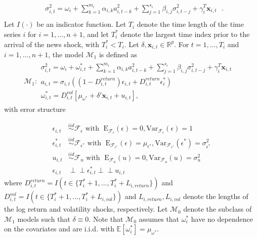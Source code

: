 \documentclass[11pt,3p,review,authoryear]{elsarticle}
\newcommand{\x}{\textbf{x}}
\def\mbf#1{\mathbf{#1}} %
\newcommand{\simiid}{\stackrel{iid}{\sim}} %
\newcommand{\indep}{\perp \!\!\! \perp } %
\def\mrm#1{\mathrm{#1}} %
\def\mc#1{\mathcal{#1}} %
\def\E{\mathbb{E}} %
\def\mc#1{\mathcal{#1}}
\theoremstyle{definition}
\begin{document}
\begin{align*}
&\sigma_{i,t}^{2} = \omega_{i} + \sum^{m_{i}}_{k=1}\alpha_{i,k}a^{2}_{i,t-k} + \sum_{j=1}^{s_{i}}\beta_{i,j}\sigma_{i,t-j}^{2} + \gamma_{i}^{T} \x_{i,t} \text{ }. \\
\end{align*}
Let $I(\cdot)$ be an indicator function.  Let $T_i$ denote the time length of the time series $i$ for $i = 1, \ldots, n+1$, and let $T_i^*$ denote the largest time index prior to the arrival of the news shock, with $T_i^* < T_i$.  Let $\delta, \x_{i,t} \in \mathbb{R}^{p}$.  For $t= 1, \ldots, T_i$ and $i = 1, \ldots, n+1$, the model $\mc{M}_1$ is defined as 
\begin{align*}
  \mc{M}_1 \colon \begin{array}{l}
     \sigma^{2}_{i,t} = \omega_{i} + \omega^{*}_{i,t} + \sum^{m_{i}}_{k=1}\alpha_{i,k}a^{2}_{i,t-k} + \sum_{j=1}^{s_{i}}\beta_{i,j}\sigma_{i,t-j}^{2} + \gamma_{i}^{T} \x_{i,t} \text{ }\\[.2cm]
     a_{i,t} = \sigma_{i,t}((1-D^{return}_{i,t})\epsilon_{i,t} + D^{return}_{i,t}\epsilon^{*}_{i})\\[.2cm]
    \omega_{i,t}^{*} = D^{vol}_{i,t}[\mu_{\omega^{*}}+\delta'\mbf{x}_{i, t}+ u_{i,t}],
  \end{array}
  \end{align*}
with error structure

  \begin{align*}
    \epsilon_{i,t} &\simiid \mc{F}_{\epsilon} \text{ with }  \; \mrm{E}_{\mc{F}_{\epsilon}}(\epsilon) = 0, \mrm{Var}_{\mc{F}_{\epsilon}}(\epsilon)  = 1  \\
    \epsilon^{*}_{i,t} &\simiid \mc{F}_{\epsilon^{*}} \text{ with }  \; \mrm{E}_{\mc{F}_{\epsilon^{*}}}(\epsilon) = \mu_{\epsilon^{*}}, \mrm{Var}_{\mc{F}_{\epsilon^{*}}}(\epsilon^{*})  = \sigma^2_{\epsilon^{*}}  \\
    u_{i,t} & \simiid  \mc{F}_{u} \text{ with }  \; \mrm{E}_{\mc{F}_{u}}(u) = 0, \mrm{Var}_{\mc{F}_{u}}(u) = \sigma^2_{u}\\
    \epsilon_{i,t} & \indep  \epsilon^{*}_{i,t}  \indep u_{i,t}
    \end{align*}
where $D^{return}_{i,t} = I(t \in \{T_i^* + 1,...,T_i^* + L_{i, return}\})$ and $D^{vol}_{i,t} = I(t \in \{T_i^* + 1,...,T_i^* + L_{i, vol}\})$ and $L_{i,return},L_{i,vol}$ denote the lengths of the log return and volatility shocks, respectively.  Let $\mc{M}_{0}$ denote the subclass of $\mc{M}_{1}$ models such that $\delta \equiv 0$.  Note that $\mc{M}_{0}$ assumes that $\omega^{*}_i$ have no dependence on the covariates and are i.i.d. with $\E[ \omega^{*}_i]=\mu_{\omega^{*}}$.  
\end{document}

